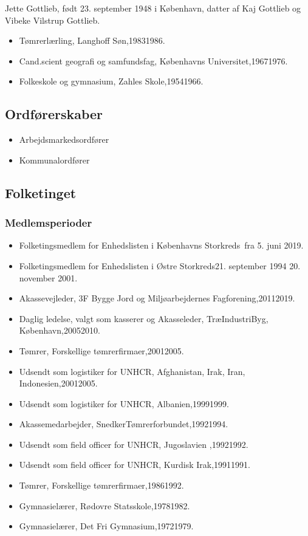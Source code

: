 \documentclass[11pt, a4paper]{awesome-cv}
\begin{document}
\makecvheader[R]
\makelettertitle
\begin{cvletter}
Jette Gottlieb, født 23. september 1948 i København, datter af Kaj Gottlieb og Vibeke Vilstrup Gottlieb.

\begin{itemize}
\item Tømrerlærling, Langhoff  Søn,19831986.
\item Cand.scient geografi og samfundsfag, Københavns Universitet,19671976.
\item Folkeskole og gymnasium, Zahles Skole,19541966.
\end{itemize}
\subsection*{Ordførerskaber}
\begin{itemize}
\item Arbejdsmarkedsordfører
\item Kommunalordfører
\end{itemize}
\subsection*{Folketinget}
\subsubsection*{Medlemsperioder}
\begin{itemize}
\item Folketingsmedlem for Enhedslisten i Københavns Storkreds fra 5. juni 2019.
\item Folketingsmedlem for Enhedslisten i Østre Storkreds21. september 1994  20. november 2001.
\end{itemize}
\begin{itemize}
\item Akassevejleder, 3F Bygge Jord og Miljøarbejdernes Fagforening,20112019.
\item Daglig ledelse, valgt som kasserer og Akasseleder, TræIndustriByg, København,20052010.
\item Tømrer, Forskellige tømrerfirmaer,20012005.
\item Udsendt som logistiker for UNHCR, Afghanistan, Irak, Iran, Indonesien,20012005.
\item Udsendt som logistiker for UNHCR, Albanien,19991999.
\item Akassemedarbejder, SnedkerTømrerforbundet,19921994.
\item Udsendt som field officer for UNHCR, Jugoslavien ,19921992.
\item Udsendt som field officer for UNHCR, Kurdisk Irak,19911991.
\item Tømrer, Forskellige tømrerfirmaer,19861992.
\item Gymnasielærer, Rødovre Statsskole,19781982.
\item Gymnasielærer, Det Fri Gymnasium,19721979.
\end{itemize}
\end{cvletter}
\end{document}
